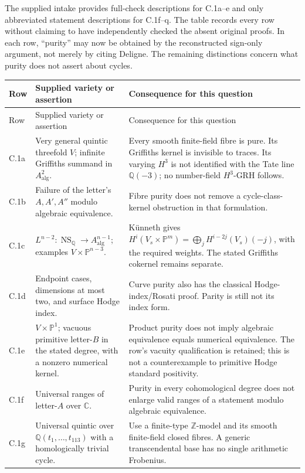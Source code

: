 \documentclass[11pt,a4paper]{article}
\theoremstyle{remark}
\begin{document}
The supplied intake provides full-check descriptions for C.1a--e and only abbreviated statement descriptions for C.1f--q. The table records every row without claiming to have independently checked the absent original proofs. In each row, ``purity'' may now be obtained by the reconstructed sign-only argument, not merely by citing Deligne. The remaining distinctions concern what purity does not assert about cycles.

{\small
\begin{longtable}{@{}p{}p{}p{}@{}}
\toprule
Row & Supplied variety or assertion & Consequence for this question \\
\midrule
\endfirsthead
\toprule
Row & Supplied variety or assertion & Consequence for this question \\
\midrule
\endhead
C.1a & Very general quintic threefold $V$; infinite Griffiths summand in $A^2_{\mathrm{alg}}$. & Every smooth finite-field fibre is pure. Its Griffiths kernel is invisible to traces. Its varying $H^3$ is not identified with the Tate line $\mathbb Q(-3)$; no number-field $H^3$-GRH follows. \\
C.1b & Failure of the letter's $A,A',A''$ modulo algebraic equivalence. & Fibre purity does not remove a cycle-class-kernel obstruction in that formulation. \\
C.1c & $L^{n-2}:\operatorname{NS}_{\mathbb Q}\to A^{n-1}_{\mathrm{alg}}$; examples $V\times\mathbb P^{n-3}$. & K\"unneth gives $H^i(V_s\times\mathbb P^m)=\bigoplus_j H^{i-2j}(V_s)(-j)$, with the required weights. The stated Griffiths cokernel remains separate. \\
C.1d & Endpoint cases, dimensions at most two, and surface Hodge index. & Curve purity also has the classical Hodge-index/Rosati proof. Parity is still not its index form. \\
C.1e & $V\times\mathbb P^1$; vacuous primitive letter-$B$ in the stated degree, with a nonzero numerical kernel. & Product purity does not imply algebraic equivalence equals numerical equivalence. The row's vacuity qualification is retained; this is not a counterexample to primitive Hodge standard positivity. \\
C.1f & Universal ranges of letter-$A$ over $\mathbb C$. & Purity in every cohomological degree does not enlarge valid ranges of a statement modulo algebraic equivalence. \\
C.1g & Universal quintic over $\mathbb Q(t_1,\ldots,t_{113})$ with a homologically trivial cycle. & Use a finite-type $\mathbb Z$-model and its smooth finite-field closed fibres. A generic transcendental base has no single arithmetic Frobenius. \\

\end{longtable}}
\end{document}
